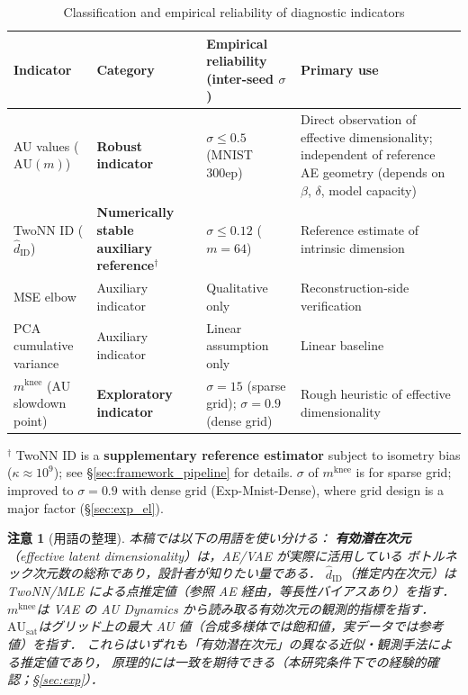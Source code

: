 \documentclass[11pt,a4paper]{jsarticle}
\newtheorem{remark}{注意}
\newcommand{\kap}{\kappa}
\newcommand{\AUsat}{\mathrm{AU}_{\mathrm{sat}}}
\newcommand{\mknee}{m^{\mathrm{knee}}}
\begin{document}
\begin{table}[H]
\centering
\caption{Classification and empirical reliability of diagnostic indicators}
\label{tab:indicator_class}
\small
\begin{tabular}{p{3.5cm}p{3.2cm}p{4.0cm}p{4.0cm}}
\toprule
Indicator & Category & Empirical reliability (inter-seed $\sigma$) & Primary use \\
\midrule
AU values ($\mathrm{AU}(m)$) & \textbf{Robust indicator} & $\sigma \leq 0.5$ (MNIST 300ep) & Direct observation of effective dimensionality; independent of reference AE geometry (depends on $\beta$, $\delta$, model capacity) \\
TwoNN ID ($\hat{d}_\mathrm{ID}$) & \textbf{Numerically stable auxiliary reference}$^\dagger$ & $\sigma \leq 0.12$ ($m=64$) & Reference estimate of intrinsic dimension \\
MSE elbow & Auxiliary indicator & Qualitative only & Reconstruction-side verification \\
PCA cumulative variance & Auxiliary indicator & Linear assumption only & Linear baseline \\
$\mknee$ (AU slowdown point) & \textbf{Exploratory indicator} & $\sigma=15$ (sparse grid); $\sigma=0.9$ (dense grid) & Rough heuristic of effective dimensionality \\
\bottomrule
\end{tabular}
\medskip
\footnotesize
$^\dagger$ TwoNN ID is a \textbf{supplementary reference estimator} subject to isometry bias ($\kap \approx 10^9$); see §\ref{sec:framework_pipeline} for details.
$\sigma$ of $\mknee$ is for sparse grid; improved to $\sigma=0.9$ with dense grid (Exp-Mnist-Dense), where grid design is a major factor (§\ref{sec:exp_el}).
\normalsize
\end{table}

\begin{remark}[用語の整理]
本稿では以下の用語を使い分ける：
\textbf{有効潜在次元}（effective latent dimensionality）は，AE/VAE が実際に活用している
ボトルネック次元数の総称であり，設計者が知りたい量である．
\textbf{$\hat{d}_\mathrm{ID}$}（推定内在次元）は TwoNN/MLE による点推定値（参照 AE 経由，等長性バイアスあり）を指す．
\textbf{$\mknee$}は VAE の AU Dynamics から読み取る有効次元の観測的指標を指す．
\textbf{$\AUsat$}はグリッド上の最大 AU 値（合成多様体では飽和値，実データでは参考値）を指す．
これらはいずれも「有効潜在次元」の異なる近似・観測手法による推定値であり，
原理的には一致を期待できる（本研究条件下での経験的確認；§\ref{sec:exp}）．
\end{remark}
\end{document}
